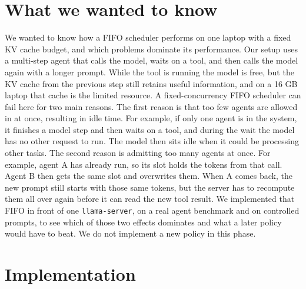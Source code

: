 \documentclass[9pt,twocolumn]{extarticle}
\begin{document}

\section{What we wanted to know}

We wanted to know how a FIFO scheduler performs on one laptop with a fixed KV cache budget, and which problems dominate its performance. Our setup uses a multi-step agent that calls the model, waits on a tool, and then calls the model again with a longer prompt. While the tool is running the model is free, but the KV cache from the previous step still retains useful information, and on a 16 GB laptop that cache is the limited resource. A fixed-concurrency FIFO scheduler can fail here for two main reasons. The first reason is that too few agents are allowed in at once, resulting in idle time. For example, if only one agent is in the system, it finishes a model step and then waits on a tool, and during the wait the model has no other request to run. The model then sits idle when it could be processing other tasks. The second reason is admitting too many agents at once. For example, agent A has already run, so its slot holds the tokens from that call. Agent B then gets the same slot and overwrites them. When A comes back, the new prompt still starts with those same tokens, but the server has to recompute them all over again before it can read the new tool result. We implemented that FIFO in front of one \texttt{llama-server}, on a real agent benchmark and on controlled prompts, to see which of those two effects dominates and what a later policy would have to beat. We do not implement a new policy in this phase.

\section{Implementation}
\end{document}
